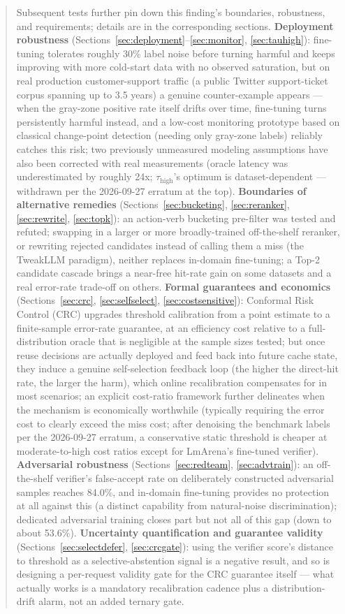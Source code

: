 \documentclass[11pt]{article}
\newcommand{\tauhigh}{\ensuremath{\tau_{\text{high}}}}
\begin{document}
\begin{abstract}
\noindent Subsequent tests further pin down this finding's boundaries, robustness, and requirements; details are in the corresponding sections. \textbf{Deployment robustness} (Sections~\ref{sec:deployment}--\ref{sec:monitor}, \ref{sec:tauhigh}): fine-tuning tolerates roughly 30\% label noise before turning harmful and keeps improving with more cold-start data with no observed saturation, but on real production customer-support traffic (a public Twitter support-ticket corpus spanning up to 3.5 years) a genuine counter-example appears --- when the gray-zone positive rate itself drifts over time, fine-tuning turns persistently harmful instead, and a low-cost monitoring prototype based on classical change-point detection (needing only gray-zone labels) reliably catches this risk; two previously unmeasured modeling assumptions have also been corrected with real measurements (oracle latency was underestimated by roughly 24x; \tauhigh's optimum is dataset-dependent --- withdrawn per the 2026-09-27 erratum at the top). \textbf{Boundaries of alternative remedies} (Sections~\ref{sec:bucketing}, \ref{sec:reranker}, \ref{sec:rewrite}, \ref{sec:topk}): an action-verb bucketing pre-filter was tested and refuted; swapping in a larger or more broadly-trained off-the-shelf reranker, or rewriting rejected candidates instead of calling them a miss (the TweakLLM paradigm), neither replaces in-domain fine-tuning; a Top-2 candidate cascade brings a near-free hit-rate gain on some datasets and a real error-rate trade-off on others. \textbf{Formal guarantees and economics} (Sections~\ref{sec:crc}, \ref{sec:selfselect}, \ref{sec:costsensitive}): Conformal Risk Control (CRC) upgrades threshold calibration from a point estimate to a finite-sample error-rate guarantee, at an efficiency cost relative to a full-distribution oracle that is negligible at the sample sizes tested; but once reuse decisions are actually deployed and feed back into future cache state, they induce a genuine self-selection feedback loop (the higher the direct-hit rate, the larger the harm), which online recalibration compensates for in most scenarios; an explicit cost-ratio framework further delineates when the mechanism is economically worthwhile (typically requiring the error cost to clearly exceed the miss cost; after denoising the benchmark labels per the 2026-09-27 erratum, a conservative static threshold is cheaper at moderate-to-high cost ratios except for LmArena's fine-tuned verifier). \textbf{Adversarial robustness} (Sections~\ref{sec:redteam}, \ref{sec:advtrain}): an off-the-shelf verifier's false-accept rate on deliberately constructed adversarial samples reaches 84.0\%, and in-domain fine-tuning provides no protection at all against this (a distinct capability from natural-noise discrimination); dedicated adversarial training closes part but not all of this gap (down to about 53.6\%). \textbf{Uncertainty quantification and guarantee validity} (Sections~\ref{sec:selectdefer}, \ref{sec:crcgate}): using the verifier score's distance to threshold as a selective-abstention signal is a negative result, and so is designing a per-request validity gate for the CRC guarantee itself --- what actually works is a mandatory recalibration cadence plus a distribution-drift alarm, not an added ternary gate. 
\end{abstract}
\end{document}

